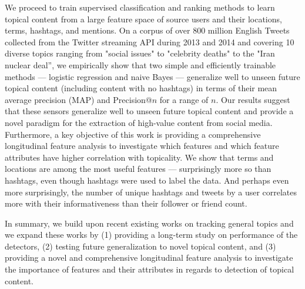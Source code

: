 We proceed to train supervised classification and ranking methods
to learn topical content from a large feature space of source users
and their locations, terms, hashtags, and mentions.  On a corpus of
over 800 million English Tweets collected from the Twitter streaming
API during 2013 and 2014 and covering 10 diverse topics ranging from
"social issues" to "celebrity deaths" to the "Iran nuclear deal'', we
empirically show that two simple and efficiently trainable methods ---
logistic regression and naive Bayes --- generalize well to unseen
future topical content (including content with no hashtags) in terms
of their mean average precision (MAP) and Precision@$n$ for a range of
$n$. Our results suggest that these
sensors generalize well to unseen future topical content and provide a
novel paradigm for the extraction of high-value content from social
media. 
Furthermore, a key objective of this work is providing a comprehensive longitudinal feature analysis to investigate which features and which feature attributes have higher correlation with topicality. We show that terms and locations are among the most
useful features --- surprisingly more so than hashtags, even though
hashtags were used to label the data.  And perhaps even more
surprisingly, the number of unique hashtags and tweets by a user
correlates more with their informativeness than their follower or
friend count.
 
In summary, we build upon recent existing works on tracking general topics and we expand these works by (1) providing a long-term study on performance of the detectors, (2) testing future generalization to novel topical content, and (3) providing a novel and comprehensive longitudinal feature analysis to investigate the importance of features and their attributes in regards to detection of topical content. 


